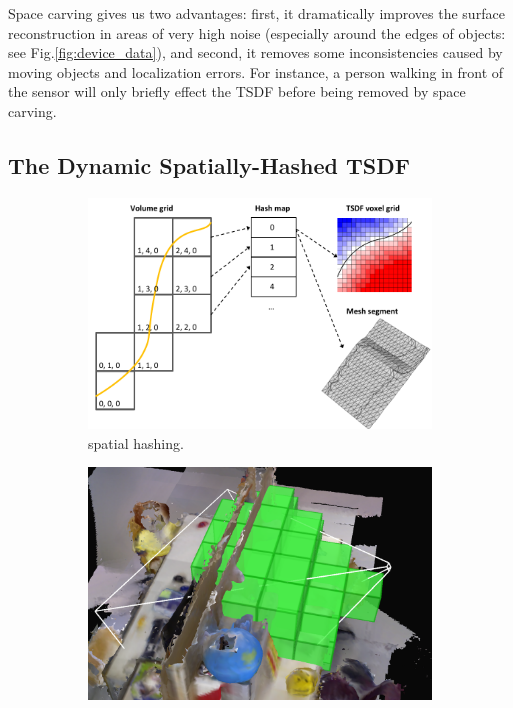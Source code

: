 \documentclass[conference]{IEEEtran}
\newcommand{\figref}[1]{Fig.\ref{#1}}
\newcommand{\TSDF}{TSDF\xspace}
\begin{document}
Space carving gives us two advantages: first, it dramatically improves the
surface reconstruction in areas of very high noise (especially around the edges
of objects: see \figref{fig:device_data}), and second, it removes
some inconsistencies caused by moving objects and localization errors. For
instance, a person walking in front of the sensor will only briefly effect the
\TSDF before being removed by space carving.
 
\subsection{The Dynamic Spatially-Hashed \TSDF}
\label{section:spatialhash}

\begin{figure}[t!] \centering
 	  	\begin{subfigure}{1.0\columnwidth} \centering
 	    \includegraphics[width=1.0\textwidth]{img/fig-volume-grid.pdf}
 	      \caption{spatial hashing.}
 	  	\label{fig:chunks}  
 	  \end{subfigure} 
 	  \begin{subfigure}{0.475\columnwidth} \centering 
	      \includegraphics[width=1.0\textwidth]{img/frustum_cull}

\end{subfigure}
\end{figure}
\end{document}
